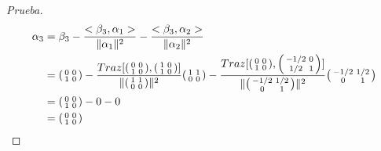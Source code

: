 \documentclass[12pt]{article}
\newenvironment{xmat}
  {\left(\begin{smallmatrix}}
  {\end{smallmatrix}\right)}
\begin{document}
\begin{proof}[Prueba]
\begin{align*}
\alpha_{3} & = \beta_{3} - \frac{<\beta_{3}, \alpha_{1}>}{\|\alpha_{1}\|^{2}}
						 - \frac{<\beta_{3}, \alpha_{2}>}{\|\alpha_{2}\|^{2}}\\
& = \begin{xmat}0 & 0\\1 & 0\end{xmat}
	- \frac{Traz[\begin{xmat}0 & 0\\1 & 0\end{xmat},\begin{xmat}1 & 0\\1 & 0\end{xmat}]}
		   {\|\begin{xmat}1 & 1\\0 & 0\end{xmat}\|^{2}}\begin{xmat}1 & 1\\0 & 0\end{xmat}
	- \frac{Traz[\begin{xmat}0 & 0\\1 & 0\end{xmat},\begin{xmat}-1/2 & 0\\1/2 & 1\end{xmat}]}
		   {\|\begin{xmat}-1/2 & 1/2\\0 & 1\end{xmat}\|^{2}}\begin{xmat}-1/2 & 1/2\\0 & 1\end{xmat}			\\
& = \begin{xmat}0 & 0\\1 & 0\end{xmat}
	- 0 - 0\\
& = \begin{xmat}0 & 0\\1 & 0\end{xmat}	
\end{align*}


\end{proof}
\end{document}
